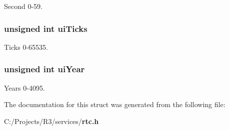 Second 0-\/59. 
\subsubsection[{uiTicks}]{\setlength{\rightskip}{0pt plus 5cm}unsigned int {\bf uiTicks}}\label{struct_r_t_c___s_t_r_u_c_t_a3f740957ff41eef1307fe82a7649bef3}


Ticks 0-\/65535. 
\subsubsection[{uiYear}]{\setlength{\rightskip}{0pt plus 5cm}unsigned int {\bf uiYear}}\label{struct_r_t_c___s_t_r_u_c_t_a6927ce9659f6012a382129e265ebbe95}


Years 0-\/4095. 

The documentation for this struct was generated from the following file:\begin{DoxyCompactItemize}
\item 
C:/Projects/R3/services/{\bf rtc.h}\end{DoxyCompactItemize}
